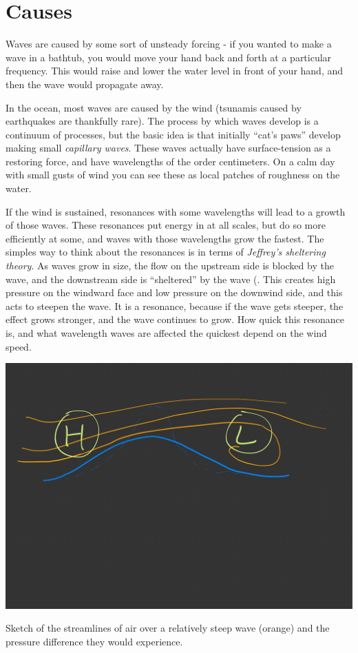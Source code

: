 \section{Causes}

Waves are caused by some sort of unsteady forcing - if you wanted to make a wave in a bathtub, you would move your hand back and forth at a particular frequency.  This would raise and lower the water level in front of your hand, and then the wave would propagate away.  

In the ocean,  most waves are caused by the wind (tsunamis caused by earthquakes are thankfully rare).  The process by which waves develop is a continuum of processes, but the basic idea is that initially ``cat's paws'' develop making small \emph{capillary waves}.  These waves actually have surface-tension as a restoring force, and have wavelengths of the order centimeters.  On a calm day with small gusts of wind you can see these as local patches of roughness on the water.  

If the wind is sustained, resonances with some wavelengths will lead to a growth of those waves.  These resonances put energy in at all scales, but do so more efficiently at some, and waves with those wavelengths grow the fastest.  The simples way to think about the resonances is in terms of \emph{Jeffrey's sheltering theory}.  As waves grow in size, the flow on the upstream side is blocked by the wave, and the downstream side is ``sheltered'' by the wave (. This creates high pressure on the windward face and low pressure on the downwind side, and this acts to steepen the wave.  It is a resonance, because if the wave gets steeper, the effect grows stronger, and the wave continues to grow.  How quick this resonance is, and what wavelength waves are affected the quickest depend on the wind speed.  

\begin{marginfigure}
    \includegraphics{figs/Waves/SketchJeffreys}
    \caption{Sketch of the streamlines of air over a relatively steep wave (orange) and the pressure difference they would experience. }
    \label{fig:SketchJeffreys}  
\end{marginfigure}


